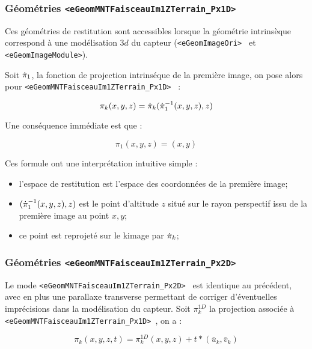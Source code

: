 
\subsubsection{G\'eom\'etries {\tt <eGeomMNTFaisceauIm1ZTerrain\_Px1D>}}

Ces g\'eom\'etries de restitution sont accessibles  lorsque la
g\'eom\'etrie intrins\`eque correspond \`a une mod\'elisation $3d$
du capteur ({\tt   <eGeomImageOri> } et {\tt   <eGeomImageModule>}).

Soit $\PiI_1$, la fonction de projection intrins\'eque de la premi\`ere
image, on pose alors  pour {\tt    <eGeomMNTFaisceauIm1ZTerrain\_Px1D> } :


\begin{equation}
   \pi_k(x,y,z) = \PiI_k (\PiI^{-1}_1(x,y,z),z)
\label{Eq:Geom:Fais}
\end{equation}

Une cons\'equence imm\'ediate est que  :

\begin{equation}
   \pi_1(x,y,z) = (x,y)
\end{equation}

Ces formule ont une interpr\'etation intuitive simple :

\begin{itemize}
   \item l'espace de restitution est l'espace des coordonn\'ees de la premi\`ere
         image;
    \item $(\PiI^{-1}_1(x,y,z),z)$ est le point d'altitude $z$ situ\'e sur le rayon 
          perspectif issu de la premi\`ere image au point $x,y$;
    \item ce point est reprojet\'e sur le k\EME image par $\PiI_k$;
\end{itemize}

\subsubsection{G\'eom\'etries {\tt <eGeomMNTFaisceauIm1ZTerrain\_Px2D>}}

Le mode {\tt    <eGeomMNTFaisceauIm1ZTerrain\_Px2D> } est identique au pr\'ec\'edent, 
avec en plus une parallaxe transverse permettant de corriger d'\'eventuelles
impr\'ecisions dans la mod\'elisation du capteur.  Soit $\pi^{1D}_k$ la 
projection associ\'ee \`a {\tt    <eGeomMNTFaisceauIm1ZTerrain\_Px1D> }, on a :

\begin{equation}
   \pi_k(x,y,z,t) = \pi^{1D}_k(x,y,z) + t*(\bar u_k,\bar v_k)
\end{equation}

